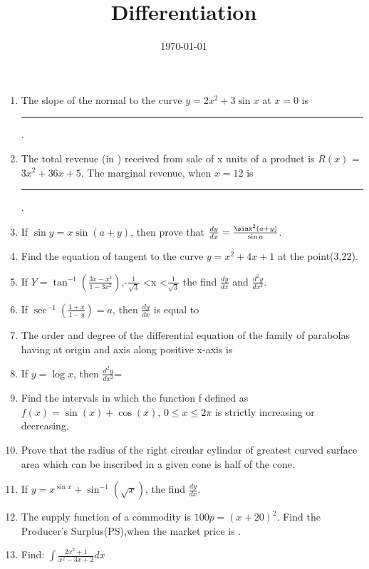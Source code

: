 \documentclass[12pt]{article}
\begin{document}
\title{\textbf{Differentiation}}
\date{\today}
\maketitle
\begin{enumerate}

\item
The slope of the normal to the curve $y=2x^2+3\sin{x}$ at $x=0$ is \rule{30pt}{1pt}.

\item
The total revenue (in \rupee) received from sale of x units of a product is $R(x)$ = $3x^2+36x+5$. The marginal revenue, when $x=12$ is \rule{30pt}{1pt}.

\item
If $\sin y = x \sin(a+y)$, then prove that $\frac {dy}{dx} = \frac {\sinx^2(a+y)}{\sin a}$.

\item
Find the equation of tangent to the curve $y=x^2+4x+1$ at the point(3,22).

\item
If $Y = \tan^{-1}\left(\frac{3x - x^3}{1 - 3x^2}\right)$,-$\frac{1}{\sqrt{3}}$ \textless x \textless $\frac{1}{\sqrt{3}}$
the find $\frac{dy}{dx}$ and $\frac{{d^2y}}{{dx^2}}$.

\item
If $\sec^{-1}\left(\frac{1+x}{1-y}\right)=a$, then $\frac{dy}{dx}$ is equal to

\item
The order and degree of the differential equation of the family of parabolas having at 
origin and axis along positive x-axis is

\item
If $y = \log x$, then $\frac{{d^2y}}{{dx^2}}$=

\item
Find the intervals in which the function f defined as 
$f(x) = \sin(x) + \cos(x)$,
$0 \leq x \leq 2\pi$ is strictly increasing or decreasing.

\item
Prove that the radius of the right circular cylindar of greatest curved surface area which 
can be inscribed in a given cone is half of the cone.

\item
If $y=x^{\sin x }+\sin^{-1}(\sqrt x)$, the find $\frac{dy}{dx}$.

\item
The supply function of a commodity is $100p = (x+20)^2$. Find the Producer's Surplus(PS),when the market price is .

\item
Find:
$\int{\frac{2x^2 + 1}{x^2 - 3x + 2}}dx$


\end{enumerate}
\end{document}
